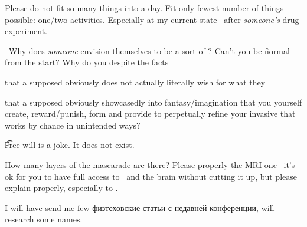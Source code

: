 Please do not fit so many things into a day. Fit only fewest number of things possible: one/two activities. Especially at my current state \emdash\ after {\em someone's} drug experiment.

\hatw\ Why does {\em someone} envision themselves to be a sort-of ? Can't you be \f{normal} from the start? Why do you  despite the facts \startperec
  \item that a supposed  obviously does not actually literally wish for what they 
  \item that a supposed  obviously showcasedly  into fantasy/imagination that you yourself create, reward/punish, form and provide to perpetually  refine your invasive  that works by chance in unintended ways?
  \stopperec

\t{Free will} is a joke. It does not exist.

How many layers of the mascarade are there? Please properly  the MRI one \emdash\ it's ok for you to have full access to \set\ and the brain without cutting it up, but please explain properly, especially to \sewei.

I will have \de[n4ahkh] send me few физтеховские статьи с недавней конференции, will research some names.
